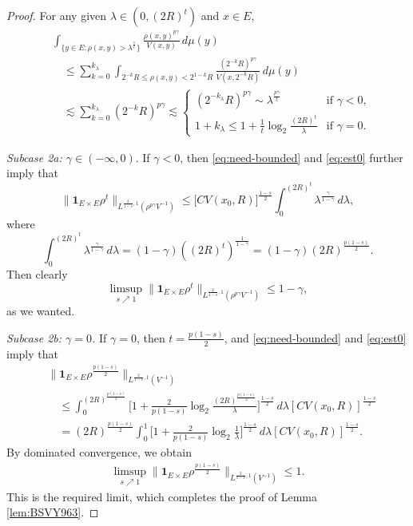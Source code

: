 \documentclass[11pt]{amsart}
\theoremstyle{definition}
\theoremstyle{remark}
\numberwithin{equation}{section}
\begin{document}
\begin{proof}
For any given $\lambda\in(0,(2R)^{t})$
and $x\in E$,
\begin{equation}\label{eq:est0}
\begin{split}
&\int_{\{y\in
E:\rho(x,y)>\lambda^{\frac{1}{t}}\}}\frac{\rho(x,y)^{p\gamma}}{V(x,y)}\,d\mu(y)\\
&\quad\le\sum_{k=0}^{k_\lambda}\int_{2^{-k}R\le
\rho(x,y)<2^{1-k}R}\frac{(2^{-k}R)^{p\gamma}}{
V(x,2^{-k}R)}\,d\mu(y) \\
&\quad\lesssim \sum_{k=0}^{k_\lambda}(2^{-k}R)^{p\gamma}
\lesssim
\begin{cases}
 (2^{-k_\lambda}R)^{p\gamma}
\sim\lambda^{\frac{p\gamma}{t}} & \text{if }\gamma<0, \\
\displaystyle
1+k_\lambda\leq 1+\frac{1}{t}\log_2\frac{(2R)^t}{\lambda} & \text{if }\gamma=0. \end{cases}
\end{split}
\end{equation}

\emph{Subcase 2a: $\gamma\in(-\infty,0)$}.
If $\gamma<0$, then \eqref{eq:need-bounded} and \eqref{eq:est0} further imply that
\begin{equation*}
\Big\|\mathbf{1}_{E\times E}\rho^{t}
\Big\|_{L^{\frac{2}{1-s},1}(\rho^{p\gamma}V^{-1})}
\le \Big[C V(x_0,R)\Big]^{\frac{1-s}{2}} \int_{0}^{(2R)^{t}}
\lambda^{\frac{\gamma}{1-\gamma}}\,d\lambda,
\end{equation*}
where
\begin{equation*}
  \int_{0}^{(2R)^{t}}\lambda^{\frac{\gamma}{1-\gamma}}\,d\lambda
  =(1-\gamma)((2R)^t)^{\frac{1}{1-\gamma}}
  =(1-\gamma)(2R)^{\frac{p(1-s)}{2}}.
\end{equation*}
Then clearly
\begin{equation*}
  \limsup_{s\nearrow 1}\Big\|\mathbf{1}_{E\times E}\rho^{t}
\Big\|_{L^{\frac{2}{1-s},1}(\rho^{p\gamma}V^{-1})}
\leq 1-\gamma,
\end{equation*}
as we wanted.

\emph{Subcase 2b: $\gamma=0$.}
If $\gamma=0$, then $t=\frac{p(1-s)}{2}$, and \eqref{eq:need-bounded} and \eqref{eq:est0}
imply that
\begin{align*}
&\Big\|\mathbf{1}_{E\times E}\rho^{\frac{p(1-s)}{2}}
\Big\|_{L^{\frac{2}{1-s},1}(V^{-1})}\\
&\quad\le \int_{0}^{(2R)^{\frac{p(1-s)}{2}}}\Big[
1+\frac{2}{p(1-s)}\log_2 \frac{(2R)^{\frac{p(1-s)}{2}}}{\lambda}\Big]^{\frac{1-s}{2}}
\,d\lambda[CV(x_0,R)]^{\frac{1-s}{2}}\\
&\quad=(2R)^{\frac{p(1-s)}{2}}\int_{0}^{1}\Big[
1+\frac{2}{p(1-s)}\log_2 \frac{1}{\lambda}\Big]^{\frac{1-s}{2}}
\,d\lambda[CV(x_0,R)]^{\frac{1-s}{2}}.
\end{align*}
By dominated convergence, we obtain
\begin{align*}
\limsup_{s\nearrow 1}\Big\|\mathbf{1}_{E\times E}\rho^{\frac{p(1-s)}{2}}
\Big\|_{L^{\frac{2}{1-s},1}(V^{-1})}\le 1.
\end{align*}
This is the required limit, which completes the proof of Lemma \ref{lem:BSVY963}.
\end{proof}
\end{document}
